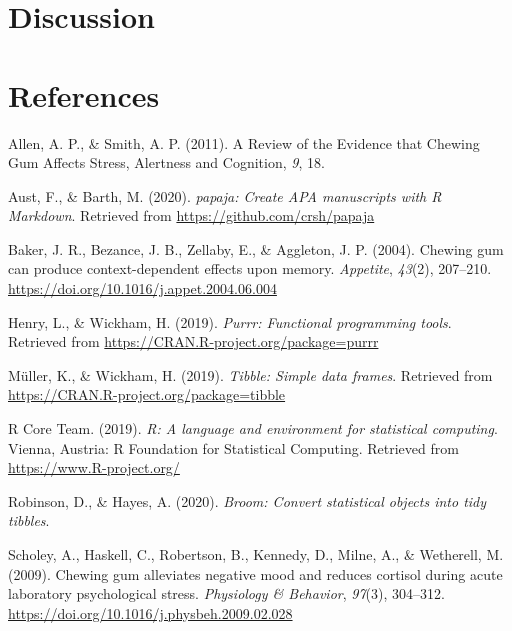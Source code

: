 \documentclass[english,man]{apa6}
\begin{document}
\hypertarget{discussion}{%
\section{Discussion}\label{discussion}}

\newpage

\hypertarget{references}{%
\section{References}\label{references}}

\begingroup
\setlength{\parindent}{-0.5in}
\setlength{\leftskip}{0.5in}

\hypertarget{refs}{}
\leavevmode\hypertarget{ref-allenReviewEvidenceThat2011}{}%
Allen, A. P., \& Smith, A. P. (2011). A Review of the Evidence that Chewing Gum Affects Stress, Alertness and Cognition, \emph{9}, 18.

\leavevmode\hypertarget{ref-R-papaja}{}%
Aust, F., \& Barth, M. (2020). \emph{papaja: Create APA manuscripts with R Markdown}. Retrieved from \url{https://github.com/crsh/papaja}

\leavevmode\hypertarget{ref-bakerChewingGumCan2004}{}%
Baker, J. R., Bezance, J. B., Zellaby, E., \& Aggleton, J. P. (2004). Chewing gum can produce context-dependent effects upon memory. \emph{Appetite}, \emph{43}(2), 207--210. \url{https://doi.org/10.1016/j.appet.2004.06.004}

\leavevmode\hypertarget{ref-R-purrr}{}%
Henry, L., \& Wickham, H. (2019). \emph{Purrr: Functional programming tools}. Retrieved from \url{https://CRAN.R-project.org/package=purrr}

\leavevmode\hypertarget{ref-R-tibble}{}%
Müller, K., \& Wickham, H. (2019). \emph{Tibble: Simple data frames}. Retrieved from \url{https://CRAN.R-project.org/package=tibble}

\leavevmode\hypertarget{ref-R-base}{}%
R Core Team. (2019). \emph{R: A language and environment for statistical computing}. Vienna, Austria: R Foundation for Statistical Computing. Retrieved from \url{https://www.R-project.org/}

\leavevmode\hypertarget{ref-R-broom}{}%
Robinson, D., \& Hayes, A. (2020). \emph{Broom: Convert statistical objects into tidy tibbles}.

\leavevmode\hypertarget{ref-scholeyChewingGumAlleviates2009}{}%
Scholey, A., Haskell, C., Robertson, B., Kennedy, D., Milne, A., \& Wetherell, M. (2009). Chewing gum alleviates negative mood and reduces cortisol during acute laboratory psychological stress. \emph{Physiology \& Behavior}, \emph{97}(3), 304--312. \url{https://doi.org/10.1016/j.physbeh.2009.02.028}
\end{document}
